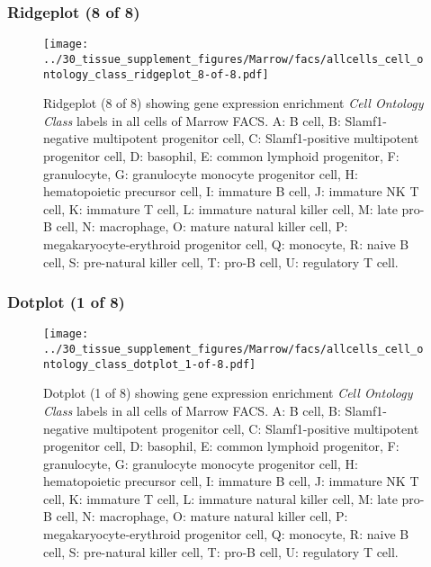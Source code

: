 \subsubsection{Ridgeplot (8 of 8)}
\begin{figure}[h]
\centering
\texttt{[image: ../30\_tissue\_supplement\_figures/Marrow/facs/allcells\_cell\_ontology\_class\_ridgeplot\_8-of-8.pdf]}

\caption{ Ridgeplot (8 of 8)  showing gene expression enrichment \emph{Cell Ontology Class} labels in all cells of Marrow FACS. A: B cell, B: Slamf1-negative multipotent progenitor cell, C: Slamf1-positive multipotent progenitor cell, D: basophil, E: common lymphoid progenitor, F: granulocyte, G: granulocyte monocyte progenitor cell, H: hematopoietic precursor cell, I: immature B cell, J: immature NK T cell, K: immature T cell, L: immature natural killer cell, M: late pro-B cell, N: macrophage, O: mature natural killer cell, P: megakaryocyte-erythroid progenitor cell, Q: monocyte, R: naive B cell, S: pre-natural killer cell, T: pro-B cell, U: regulatory T cell.}
\end{figure}


\clearpage

\subsubsection{Dotplot (1 of 8)}
\begin{figure}[h]
\centering
\texttt{[image: ../30\_tissue\_supplement\_figures/Marrow/facs/allcells\_cell\_ontology\_class\_dotplot\_1-of-8.pdf]}

\caption{ Dotplot (1 of 8)  showing gene expression enrichment \emph{Cell Ontology Class} labels in all cells of Marrow FACS. A: B cell, B: Slamf1-negative multipotent progenitor cell, C: Slamf1-positive multipotent progenitor cell, D: basophil, E: common lymphoid progenitor, F: granulocyte, G: granulocyte monocyte progenitor cell, H: hematopoietic precursor cell, I: immature B cell, J: immature NK T cell, K: immature T cell, L: immature natural killer cell, M: late pro-B cell, N: macrophage, O: mature natural killer cell, P: megakaryocyte-erythroid progenitor cell, Q: monocyte, R: naive B cell, S: pre-natural killer cell, T: pro-B cell, U: regulatory T cell.}
\end{figure}


\clearpage

